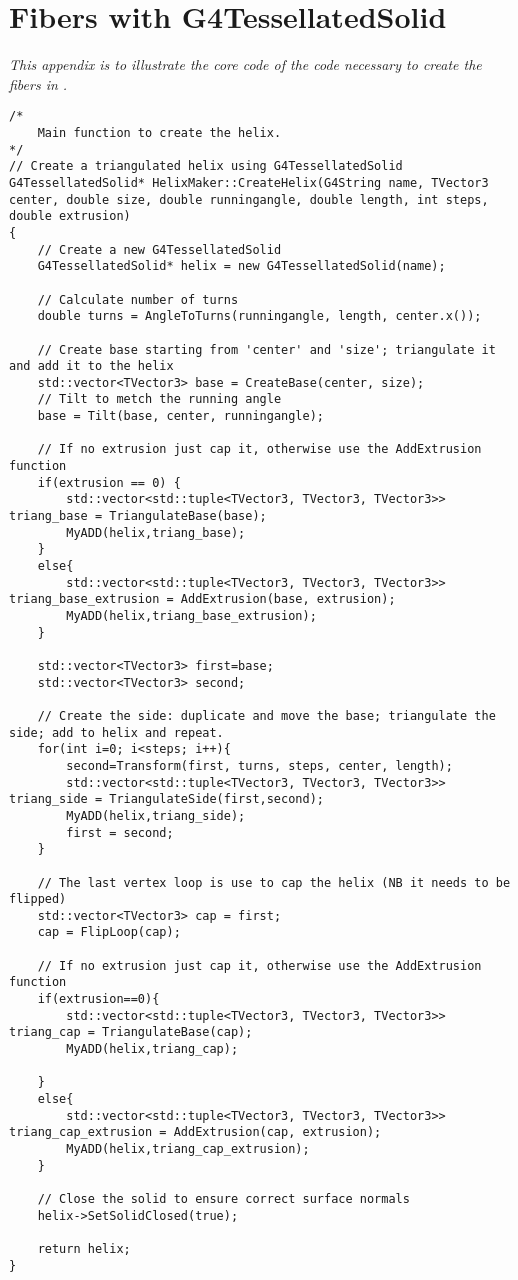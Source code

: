 
\chapter{Fibers with G4TessellatedSolid}
{\itshape
This appendix is to illustrate the core code of the code necessary to create the fibers in \gf.}
\label{ch:G4TessellatedSolid}
\begin{lstlisting}
/*
    Main function to create the helix. 
*/
// Create a triangulated helix using G4TessellatedSolid
G4TessellatedSolid* HelixMaker::CreateHelix(G4String name, TVector3 center, double size, double runningangle, double length, int steps, double extrusion)
{
    // Create a new G4TessellatedSolid
    G4TessellatedSolid* helix = new G4TessellatedSolid(name);

    // Calculate number of turns
    double turns = AngleToTurns(runningangle, length, center.x());
	
    // Create base starting from 'center' and 'size'; triangulate it and add it to the helix
	std::vector<TVector3> base = CreateBase(center, size);
    // Tilt to metch the running angle
    base = Tilt(base, center, runningangle);

    // If no extrusion just cap it, otherwise use the AddExtrusion function
    if(extrusion == 0) {
        std::vector<std::tuple<TVector3, TVector3, TVector3>> triang_base = TriangulateBase(base);
	    MyADD(helix,triang_base);
    }
    else{
        std::vector<std::tuple<TVector3, TVector3, TVector3>> triang_base_extrusion = AddExtrusion(base, extrusion);
        MyADD(helix,triang_base_extrusion);
    }

	std::vector<TVector3> first=base;
	std::vector<TVector3> second;

	// Create the side: duplicate and move the base; triangulate the side; add to helix and repeat. 
	for(int i=0; i<steps; i++){
		second=Transform(first, turns, steps, center, length);
		std::vector<std::tuple<TVector3, TVector3, TVector3>> triang_side = TriangulateSide(first,second);
		MyADD(helix,triang_side);
		first = second; 
	}

	// The last vertex loop is use to cap the helix (NB it needs to be flipped)
    std::vector<TVector3> cap = first;
    cap = FlipLoop(cap);

    // If no extrusion just cap it, otherwise use the AddExtrusion function
    if(extrusion==0){
        std::vector<std::tuple<TVector3, TVector3, TVector3>> triang_cap = TriangulateBase(cap);
	    MyADD(helix,triang_cap);
	
    }
    else{
        std::vector<std::tuple<TVector3, TVector3, TVector3>> triang_cap_extrusion = AddExtrusion(cap, extrusion);
        MyADD(helix,triang_cap_extrusion);
    }
	
    // Close the solid to ensure correct surface normals
    helix->SetSolidClosed(true);

    return helix;
}

\end{lstlisting}
